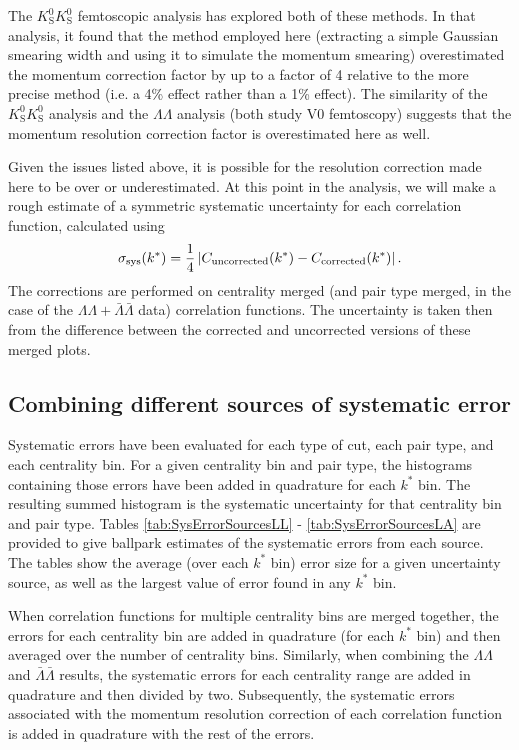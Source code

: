 The $K^0_\mathrm{S}K^0_\mathrm{S}$ femtoscopic analysis has explored both of these methods.  In that analysis, it found that the method employed here (extracting a simple Gaussian smearing width and using it to simulate the momentum smearing) overestimated the momentum correction factor by up to a factor of 4 relative to the more precise method (i.e. a 4\% effect rather than a 1\% effect).  The similarity of the $K^0_\mathrm{S}K^0_\mathrm{S}$ analysis and the $\Lambda\Lambda$ analysis (both study V0 femtoscopy) suggests that the momentum resolution correction factor is overestimated here as well.

Given the issues listed above, it is possible for the resolution correction made here to be over or underestimated. At this point in the analysis, we will make a rough estimate of a symmetric systematic uncertainty for each correlation function, calculated using
\begin{equation}
\sigma_{\mathrm{sys}}(k^*) = \frac{1}{4}\left\lvert C_{\mathrm{uncorrected}} (k^*) - C_{\mathrm{corrected}}(k^*)\right\rvert.
\end{equation}
The corrections are performed on centrality merged (and pair type merged, in the case of the $\Lambda\Lambda + \bar{\Lambda}\bar{\Lambda}$ data) correlation functions.  The uncertainty is taken then from the difference between the corrected and uncorrected versions of these merged plots.

\subsection{Combining different sources of systematic error}
\label{sec:CombiningSys}

Systematic errors have been evaluated for each type of cut, each pair type, and each centrality bin.  For a given centrality bin and pair type, the histograms containing those errors have been added in quadrature for each $k^*$ bin.  The resulting summed histogram is the systematic uncertainty for that centrality bin and pair type.  Tables \ref{tab:SysErrorSourcesLL} - \ref{tab:SysErrorSourcesLA} are provided to give ballpark estimates of the systematic errors from each source.  The tables show the average (over each $k^*$ bin) error size for a given uncertainty source, as well as the largest value of error found in any $k^*$ bin.

When correlation functions for multiple centrality bins are merged together, the errors for each centrality bin are added in quadrature (for each $k^*$ bin) and then averaged over the number of centrality bins.  Similarly, when combining the $\Lambda\Lambda$ and $\bar{\Lambda}\bar{\Lambda}$ results, the systematic errors for each centrality range are added in quadrature and then divided by two.  Subsequently, the systematic errors associated with the momentum resolution correction of each correlation function is added in quadrature with the rest of the errors.

